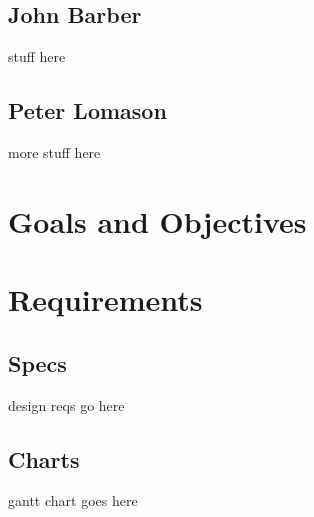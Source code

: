 \documentclass[a4paper,10pt]{article}
\begin{document}
\subsection{John Barber}
stuff here
\subsection{Peter Lomason}
more stuff here

\section{Goals and Objectives}

\section{Requirements}
\subsection{Specs}
design reqs go here
\subsection{Charts}
gantt chart goes here
\end{document}
